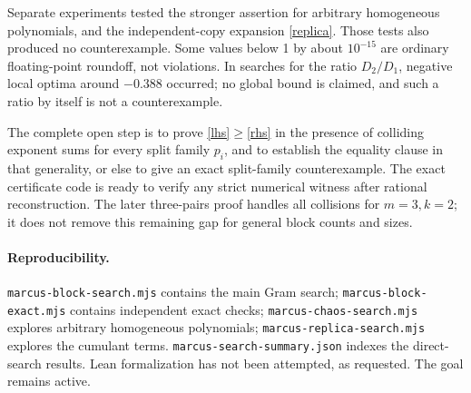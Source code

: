 \documentclass[11pt]{article}
\begin{document}
Separate experiments tested the stronger assertion for arbitrary homogeneous
polynomials, and the independent-copy expansion \eqref{replica}. Those tests
also produced no counterexample. Some values below 1 by about $10^{-15}$
are ordinary floating-point roundoff, not violations. In searches for the
ratio $D_2/D_1$, negative local optima around $-0.388$ occurred; no global
bound is claimed, and such a ratio by itself is not a counterexample.

The complete open step is to prove \eqref{lhs}$\geq$\eqref{rhs} in the presence
of colliding exponent sums for every split family $p_i$, and to establish
the equality clause in that generality, or else to give an exact split-family
counterexample. The exact certificate code is ready to verify any strict
numerical witness after rational reconstruction.
The later three-pairs proof handles all collisions for $m=3,k=2$; it does
not remove this remaining gap for general block counts and sizes.

\paragraph{Reproducibility.}
\texttt{marcus-block-search.mjs} contains the main Gram search;
\texttt{marcus-block-exact.mjs} contains independent exact checks;
\texttt{marcus-chaos-search.mjs} explores arbitrary homogeneous polynomials;
\texttt{marcus-replica-search.mjs} explores the cumulant terms.
\texttt{marcus-search-summary.json} indexes the direct-search results.
Lean formalization has not been attempted, as requested. The goal remains active.
\end{document}
